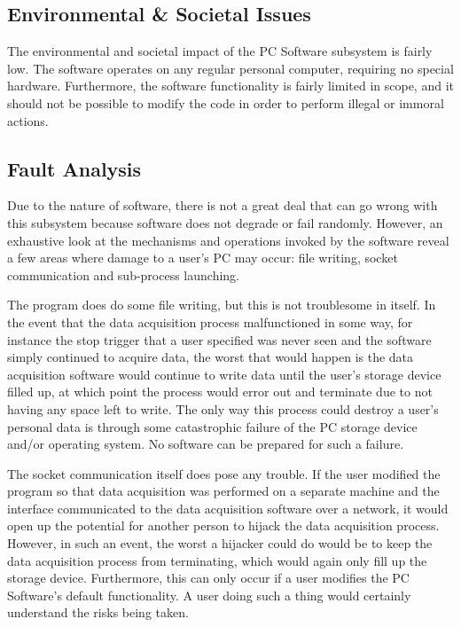 \subsection[Environmental \& Societal Issues]{Environmental \& Societal Issues}
The environmental and societal impact of the PC Software subsystem is fairly low. The software
operates on any regular personal computer, requiring no special hardware. Furthermore, the
software functionality is fairly limited in scope, and it should not be possible to modify
the code in order to perform illegal or immoral actions.


\subsection[Fault Analysis]{Fault Analysis}
Due to the nature of software, there is not a great deal that can go wrong with this subsystem 
because software does not degrade or fail randomly. However, an exhaustive look at the mechanisms and
operations invoked by the software reveal a few areas where damage to a user's PC may occur: file 
writing, socket communication and sub-process launching.

The program does do some file writing, but this is not troublesome in itself. In the event that the data
 acquisition process malfunctioned in some way, for instance the stop trigger that a user specified was 
never seen and the software simply continued to acquire data, the worst that would happen is the data
acquisition software would continue to write data until the user's storage device filled up, at which
point the process would error out and terminate due to not having any space left to write. The only way
this process could destroy a user's personal data is through some catastrophic failure of the PC storage
device and/or operating system. No software can be prepared for such a failure.

The socket communication itself does pose any trouble. If the user modified the program so that data
acquisition was performed on a separate machine and the interface communicated to the data acquisition
software over a network, it would open up the potential for another person to hijack the data acquisition
process. However, in such an event, the worst a hijacker could do would be to keep the data acquisition
process from terminating, which would again only fill up the storage device. Furthermore, this can only
occur if a user modifies the PC Software's default functionality. A user doing such a thing would certainly
understand the risks being taken.

